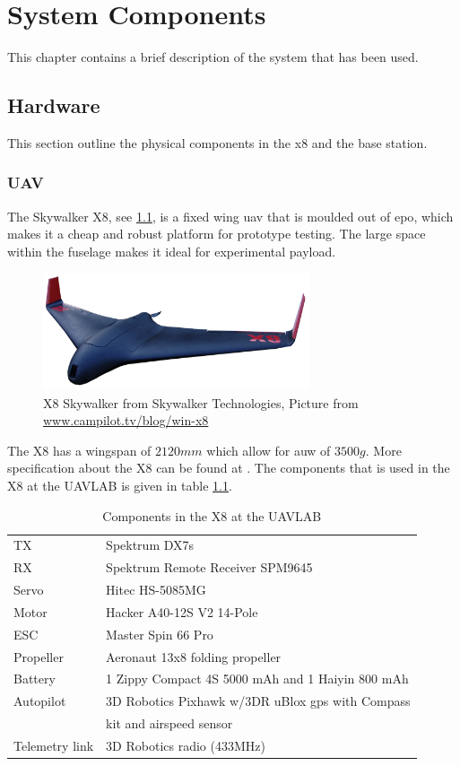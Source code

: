 
\chapter{System Components}
This chapter contains a brief description of the system that has been used.
\section{Hardware}
This section outline the physical components in the x8 and the base station.
\subsection{UAV}\label{ss:SkywalkerX8}
The Skywalker X8, see \ref{figure:skywalkerX8}, is a fixed wing \gls{uav} that is moulded out of \gls{epo}, which makes it a cheap and robust platform for prototype testing. The large space within the fuselage makes it ideal for experimental payload. 
\begin{figure}[H]
	\centering
		\includegraphics[width=0.7\textwidth]{figs/Wing-X8_white-bgd2.png}
		\caption{X8 Skywalker from Skywalker Technologies, Picture from \url{www.campilot.tv/blog/win-x8}}
		\label{figure:skywalkerX8}
\end{figure}
The X8 has a wingspan of $2120mm$ which allow for \gls{auw} of $3500g$. More specification about the X8 can be found at \citep{hobbyking}. The components that is used in the X8 at the UAVLAB is given in table \ref{tb:X8Components}.
\begin{table}[H]
\begin{center}
\begin{tabular}{l l}
TX & Spektrum DX7s \\
RX & Spektrum Remote Receiver SPM9645 \\
Servo & Hitec HS-5085MG \\
Motor & Hacker A40-12S V2 14-Pole \\
ESC & Master Spin 66 Pro \\
Propeller & Aeronaut 13x8 folding propeller \\
Battery & 1 Zippy Compact 4S 5000 mAh and 1 Haiyin 800 mAh \\
Autopilot & 3D Robotics Pixhawk w/3DR uBlox \gls{gps} with Compass\\& kit and airspeed sensor \\
Telemetry link & 3D Robotics radio (433MHz)
\end{tabular}
\end{center}
\caption{Components in the X8 at the UAVLAB}
\label{tb:X8Components}
\end{table}
